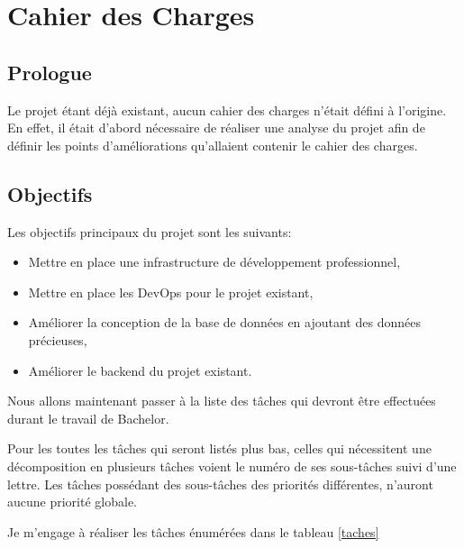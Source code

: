 \documentclass[
    iai, %
    il, %
]{heig-tb}
\begin{document}
\section{Cahier des Charges}

\subsection{Prologue}

Le projet étant déjà existant, aucun cahier des charges n'était défini à
l'origine. En effet, il était d'abord nécessaire de réaliser une analyse
du projet afin de définir les points d'améliorations qu'allaient
contenir le cahier des charges.

\subsection{Objectifs}

Les objectifs principaux du projet sont les suivants:
\begin{itemize}
    \item Mettre en place une infrastructure de développement professionnel,
    \item Mettre en place les DevOps pour le projet existant,
    \item Améliorer la conception de la base de données en ajoutant des données précieuses,
    \item Améliorer le backend du projet existant.
\end{itemize}

\newpage
Nous allons maintenant passer à la liste des tâches qui devront être
effectuées durant le travail de Bachelor.

Pour les toutes les tâches qui seront listés plus bas, celles qui nécessitent une décomposition en plusieurs tâches voient le numéro de ses sous-tâches suivi d'une lettre. Les tâches possédant des sous-tâches des priorités différentes, n'auront aucune priorité globale.

Je m'engage à réaliser les tâches énumérées dans le tableau \ref{taches}
\end{document}
